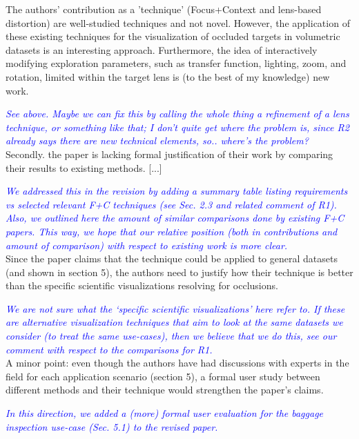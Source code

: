 \documentclass[a4paper,10pt]{article}
\newcommand{\rr}[1]{\emph{\textcolor{blue}{#1}}}
\begin{document}
    The authors' contribution as a 'technique' (Focus+Context and lens-based
    distortion) are well-studied techniques and not novel. However, the application of
    these existing techniques for the visualization of occluded targets in volumetric
    datasets is an interesting approach. Furthermore, the idea of interactively
    modifying exploration parameters, such as transfer function, lighting, zoom, and
    rotation, limited within the target lens is (to the best of my knowledge) new
    work.
    
    \rr{See above. Maybe we can fix this by calling the whole thing a refinement of a lens technique, or something like that; I don't quite get where the problem is, since R2 already says there are new technical elements, so.. where's the problem?}\\

    Secondly. the paper is lacking formal justification of their work by comparing
    their results to existing methods. [...]
    
    \rr{We addressed this in the revision by adding a summary table listing requirements \emph{vs} selected relevant F+C techniques (see Sec. 2.3 and related comment of R1). Also, we outlined here the amount of similar comparisons done by existing F+C papers. This way, we hope that our relative position (both in contributions and amount of comparison) with respect to existing work is more clear.}\\
    
    Since the paper claims that the technique could be applied to
    general datasets (and shown in section 5), the authors need to justify how their
    technique is better than the specific scientific visualizations resolving for
    occlusions.
    
    \rr{We are not sure what the `specific scientific visualizations' here refer to. If these are alternative visualization techniques that aim to look at the same datasets we consider (to treat the same use-cases), then we believe that we do this, see our comment with respect to the comparisons for R1.}\\
    
    A minor point: even though the authors have had discussions with experts in the
    field for each application scenario (section 5), a formal user study between
    different methods and their technique would strengthen the paper's claims.
    
    \rr{In this direction, we added a (more) formal user evaluation for the baggage inspection use-case (Sec. 5.1) to the revised paper.}\\
\end{document}
